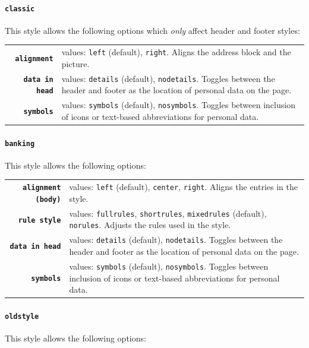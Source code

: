 \documentclass[a4paper, 11pt]{article}
\newcommand{\code}[1]{\lstinline!#1!}
\begin{document}
\paragraph{\code{classic}}
This style allows the following options which \emph{only} affect header and footer styles:

\begin{tabular}{r@{\hspace{2ex}}p{}}
  \textbf{\code{alignment}}    & values: \code{left} (default), \code{right}.
  Aligns the address block and the picture. \\
  \textbf{\code{data in head}} & values: \code{details} (default), \code{nodetails}.
  Toggles between the header and footer as the location of personal data on the page. \\
  \textbf{\code{symbols}}      & values: \code{symbols} (default), \code{nosymbols}.
  Toggles between inclusion of icons or text-based abbreviations for personal data.
\end{tabular}

\paragraph{\code{banking}}
This style allows the following options:

\begin{tabular}{r@{\hspace{2ex}}p{}}
  \textbf{\code{alignment (body)}} & values: \code{left} (default), \code{center}, \code{right}.
  Aligns the entries in the style. \\
  \textbf{\code{rule style}}       & values: \code{fullrules}, \code{shortrules}, \code{mixedrules} (default), \code{norules}.
  Adjusts the rules used in the style. \\
  \textbf{\code{data in head}}     & values: \code{details} (default), \code{nodetails}.
  Toggles between the header and footer as the location of personal data on the page. \\
  \textbf{\code{symbols}}          & values: \code{symbols} (default), \code{nosymbols}.
  Toggles between inclusion of icons or text-based abbreviations for personal data.
\end{tabular}

\paragraph{\code{oldstyle}}
This style allows the following options:
\end{document}
